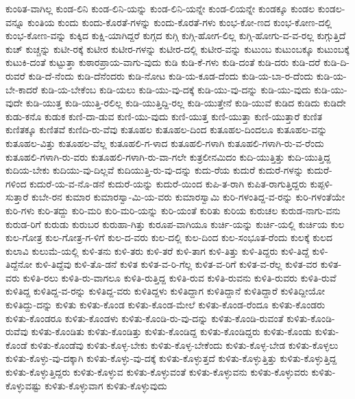 {ಕುಂಠಿತ-ವಾಗಿಲ್ಲ
ಕುಂಡ-ಲಿನಿ
ಕುಂಡ-ಲಿನಿ-ಯನ್ನು
ಕುಂಡ-ಲಿನಿ-ಯನ್ನೇ
ಕುಂಡ-ಲಿಯನ್ನೇ
ಕುಂಡಕ್ಕೂ
ಕುಂಡಲ
ಕುಂಡಲ-ವನ್ನೂ
ಕುಂತಿಯ
ಕುಂದು
ಕುಂದು-ಕೊರತೆ-ಗಳನ್ನು
ಕುಂದು-ಕೊರತೆ-ಗಳು
ಕುಂಭ-ಕೋ-ಣದ
ಕುಂಭ-ಕೋಣ-ದಲ್ಲಿ
ಕುಂಭ-ಕೋಣ-ವನ್ನು
ಕುಕ್ಕಿದ
ಕುಕ್ಷಿ-ಯಾಗಿದ್ದರೆ
ಕುಗ್ಗದ
ಕುಗ್ಗಿ
ಕುಗ್ಗಿ-ಹೋಗ-ಲಿಲ್ಲ
ಕುಗ್ಗಿ-ಹೋಗು-ವ-ವ-ರಲ್ಲ
ಕುಗ್ಗುತ್ತಿದೆ
ಕುಚ್
ಕುಚ್ಚನ್ನು
ಕುಟೀ-ರಕ್ಕೆ
ಕುಟೀರ
ಕುಟೀರ-ಗಳನ್ನು
ಕುಟೀರ-ದಲ್ಲಿ
ಕುಟೀರ-ವನ್ನು
ಕುಟುಂಬ
ಕುಟುಂಬಕ್ಕೂ
ಕುಟುಂಬಕ್ಕೆ
ಕುಟುಕಿ-ದಂತೆ
ಕುಟ್ಟುತ್ತಾ
ಕುಠಾರಪ್ರಾಯ-ವಾಗು-ವುದು
ಕುಡಿ
ಕುಡಿ-ಕೆ-ಗಳು
ಕುಡಿ-ದಂತೆ
ಕುಡಿ-ದರು
ಕುಡಿ-ದರೆ
ಕುಡಿ-ದಿ-ರುವರೆ
ಕುಡಿ-ದೆ-ನೆಂದು
ಕುಡಿ-ದೆನೆಂದರು
ಕುಡಿ-ನೋಟ
ಕುಡಿ-ಯ-ಕೂಡ-ದೆಂದು
ಕುಡಿ-ಯ-ಬಾ-ರ-ದೆಂದು
ಕುಡಿ-ಯ-ಬೇ-ಕಾದರೆ
ಕುಡಿ-ಯ-ಬೇಕೆಂಬ
ಕುಡಿ-ಯಲು
ಕುಡಿ-ಯು-ವು-ದಕ್ಕೆ
ಕುಡಿ-ಯು-ವು-ದನ್ನು
ಕುಡಿ-ಯು-ವುದು
ಕುಡಿ-ಯು-ವುದೇ
ಕುಡಿ-ಯುತ್ತ
ಕುಡಿ-ಯುತ್ತಿ-ರಲಿಲ್ಲ
ಕುಡಿ-ಯುತ್ತಿದ್ದಿ-ರಲ್ಲ
ಕುಡಿ-ಯುತ್ತೇನೆ
ಕುಡಿ-ಯುವೆ
ಕುಡಿದ
ಕುಡಿದು
ಕುಡಿದೇ
ಕುಡು-ಕನೊ
ಕುಡುಕ
ಕುಣಿ-ದಾ-ಡುವ
ಕುಣಿ-ಯು-ವುದು
ಕುಣಿ-ಯುತ್ತ
ಕುಣಿ-ಯುತ್ತಾ
ಕುಣಿ-ಯುತ್ತಾರೆ
ಕುಣಿತ
ಕುಣಿತಕ್ಕೂ
ಕುಣಿತವೆ
ಕುಣಿದಿ-ರು-ವೆವು
ಕುತೂಹಲ
ಕುತೂಹಲ-ದಿಂದ
ಕುತೂಹಲ-ದಿಂದಲೂ
ಕುತೂಹಲ-ವನ್ನು
ಕುತೂಹಲ-ವಿತ್ತು
ಕುತೂಹಲ-ವೆಲ್ಲ
ಕುತೂಹಲಿ-ಗ-ಳಾದ
ಕುತೂಹಲಿ-ಗಳಾಗಿ
ಕುತೂಹಲಿ-ಗಳಾಗಿ-ರು-ವ-ರೆಂದು
ಕುತೂಹಲಿ-ಗಳಾಗಿ-ರು-ವರು
ಕುತೂಹಲಿ-ಗಳಾಗಿ-ರು-ವಾ-ಗಲೇ
ಕುತ್ರಲೀನಮಿದಂ
ಕುದಿ-ಯುತ್ತಿತ್ತು
ಕುದಿ-ಯುತ್ತಿದ್ದ
ಕುದಿಯ-ಬೇಕು
ಕುದಿಯು-ವು-ದಿಲ್ಲವೆ
ಕುದಿಯುತ್ತಿ-ರು-ವು-ದನ್ನು
ಕುದು-ರೆಯ
ಕುದುರೆ
ಕುದುರೆ-ಗಳನ್ನು
ಕುದುರೆ-ಗಳಿಂದ
ಕುದುರೆ-ಯ-ವ-ನೊ-ಡನೆ
ಕುದುರೆ-ಯನ್ನು
ಕುದುರೆ-ಯಿಂದ
ಕುಪಿ-ತ-ರಾಗಿ
ಕುಪಿತ-ರಾಗುತ್ತಿದ್ದರು
ಕುಪ್ಪಳಿ-ಸುತ್ತಾರೆ
ಕುಬೇ-ರನ
ಕುಮಾರ
ಕುಮಾರಸ್ವಾ-ಮಿ-ಯ-ವರು
ಕುಮಾರಸ್ವಾಮಿ
ಕುರಿ-ಗಳಂತಿದ್ದ-ವ-ರನ್ನು
ಕುರಿ-ಗಳಂತೆಯೇ
ಕುರಿ-ಗಳು
ಕುರಿ-ತದ್ದು
ಕುರಿ-ಮರಿ
ಕುರಿ-ಮರಿ-ಯನ್ನು
ಕುರಿ-ಯಂತೆ
ಕುರಿತು
ಕುರಿಯ
ಕುರುಚಲ
ಕುರುಡ-ನಾಗು-ವನು
ಕುರುಡ-ರಿಗೆ
ಕುರುಡು
ಕುರುಬರ
ಕುರುಹಾ-ಗಿತ್ತು
ಕುರೂಪ-ವಾಗಿಯೂ
ಕುರ್ಚಿ-ಯನ್ನು
ಕುರ್ಚಿ-ಯಲ್ಲಿ
ಕುರ್ಚಿಯ
ಕುಲ
ಕುಲ-ಗೋತ್ರ
ಕುಲ-ಗೋತ್ರ-ಗ-ಳಿಗೆ
ಕುಲ-ದ-ವರು
ಕುಲ-ದಲ್ಲಿ
ಕುಲ-ದಿಂದ
ಕುಲ-ಸಂಭೂತ-ರೆಂದು
ಕುಲಕ್ಕೆ
ಕುಲದ
ಕುಲಾವಿ
ಕುಲುಮೆ-ಯಲ್ಲಿ
ಕುಳಿ-ತನು
ಕುಳಿ-ತರು
ಕುಳಿ-ತರೆ
ಕುಳಿ-ತಾಗ
ಕುಳಿ-ತಿತ್ತು
ಕುಳಿ-ತಿದ್ದರು
ಕುಳಿ-ತಿದ್ದೆ
ಕುಳಿ-ತಿದ್ದೆನೋ
ಕುಳಿ-ತಿದ್ದೆವು
ಕುಳಿ-ತೊ-ಡನೆ
ಕುಳಿತ
ಕುಳಿತ-ವ-ರಿ-ಗೆಲ್ಲ
ಕುಳಿತ-ವ-ರಿಗೆ
ಕುಳಿತ-ವ-ರೆಲ್ಲ
ಕುಳಿತ-ವರ
ಕುಳಿತ-ವರು
ಕುಳಿತಿ-ರಲು
ಕುಳಿತಿ-ರು-ವಾಗಲೂ
ಕುಳಿತಿ-ರುತ್ತಿದ್ದ
ಕುಳಿತಿ-ರುವ
ಕುಳಿತಿ-ರುವನು
ಕುಳಿತಿ-ರುವರು
ಕುಳಿತಿ-ರುವೆ
ಕುಳಿತಿದ್ದ
ಕುಳಿತಿದ್ದ-ವ-ರನ್ನು
ಕುಳಿತಿದ್ದ-ವರು
ಕುಳಿತಿದ್ದಳು
ಕುಳಿತಿದ್ದಾಗ
ಕುಳಿತಿದ್ದಾನೆ
ಕುಳಿತಿದ್ದಾರೆ
ಕುಳಿತಿದ್ದೀಯೋ
ಕುಳಿತಿದ್ದು-ದನ್ನು
ಕುಳಿತು
ಕುಳಿತು-ಕೊಂಡ
ಕುಳಿತು-ಕೊಂಡ-ಮೇಲೆ
ಕುಳಿತು-ಕೊಂಡ-ರೆಂದೂ
ಕುಳಿತು-ಕೊಂಡರು
ಕುಳಿತು-ಕೊಂಡರೂ
ಕುಳಿತು-ಕೊಂಡಳು
ಕುಳಿತು-ಕೊಂಡಿ-ರು-ವು-ದನ್ನು
ಕುಳಿತು-ಕೊಂಡಿ-ರುವಂತೆ
ಕುಳಿತು-ಕೊಂಡಿ-ರುವೆವು
ಕುಳಿತು-ಕೊಂಡಿತು
ಕುಳಿತು-ಕೊಂಡಿತ್ತು
ಕುಳಿತು-ಕೊಂಡಿದ್ದ
ಕುಳಿತು-ಕೊಂಡಿದ್ದರು
ಕುಳಿತು-ಕೊಂಡು
ಕುಳಿತು-ಕೊಂಡೆ
ಕುಳಿತು-ಕೊಂಡೆವು
ಕುಳಿತು-ಕೊಳ್ಳ-ಬೇಕು
ಕುಳಿತು-ಕೊಳ್ಳ-ಬೇಕೆಂದು
ಕುಳಿತು-ಕೊಳ್ಳ-ಬೇಡ
ಕುಳಿತು-ಕೊಳ್ಳಲು
ಕುಳಿತು-ಕೊಳ್ಳು-ವು-ದಕ್ಕಾಗಿ
ಕುಳಿತು-ಕೊಳ್ಳು-ವು-ದಕ್ಕೆ
ಕುಳಿತು-ಕೊಳ್ಳುತ್ತದೆ
ಕುಳಿತು-ಕೊಳ್ಳುತ್ತಿತ್ತು
ಕುಳಿತು-ಕೊಳ್ಳುತ್ತಿದ್ದ
ಕುಳಿತು-ಕೊಳ್ಳುತ್ತಿದ್ದರು
ಕುಳಿತು-ಕೊಳ್ಳುವ
ಕುಳಿತು-ಕೊಳ್ಳುವಂತೆ
ಕುಳಿತು-ಕೊಳ್ಳುವನು
ಕುಳಿತು-ಕೊಳ್ಳುವರು
ಕುಳಿತು-ಕೊಳ್ಳುವಷ್ಟು
ಕುಳಿತು-ಕೊಳ್ಳುವಾಗ
ಕುಳಿತು-ಕೊಳ್ಳುವುದು
}
